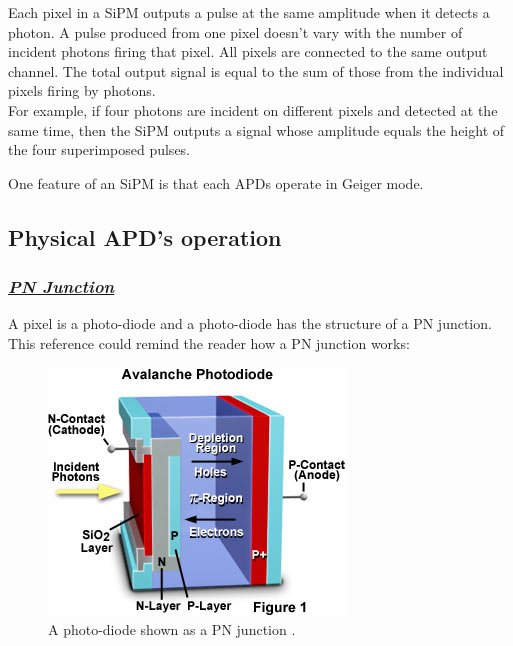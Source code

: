 \documentclass[a4paper, 11pt]{report}%
\begin{document}
  Each pixel in a SiPM outputs a pulse at the same amplitude when it detects a photon. 
  A pulse produced from one pixel doesn't vary with the number of incident photons firing that pixel. 
  All pixels are connected to the same output channel. The total output signal is equal to the sum of those from the individual pixels 
  firing by photons.
  \\
  
  For example, if four photons are incident on different pixels and detected at the same time, then the SiPM outputs a signal whose 
  amplitude equals the height of the four superimposed pulses.

 
  One feature of an SiPM is that each APDs operate in Geiger mode.
  
  \subsection{Physical APD's operation}

  \subsubsection{\textit{\underline{PN Junction}}}
  
  A pixel is a photo-diode and a photo-diode has the structure of a PN junction. This reference \cite{ref:PN_junction_ref} could remind the reader how 
  a PN junction works:
  
  \newpage
  
  \begin{figure}[!hbtp]
  \centering
    \includegraphics[trim=0cm 0cm 0cm 0cm, clip=true,totalheight=.4\textwidth]{../Pictures/APD_Hammamatsu.jpg} 
    \caption{A photo-diode shown as a PN junction \cite{ref:Hammamatsu_pn_junction}.}
    \label{fig:PN_junction}
  \end{figure}
    
\end{document}
